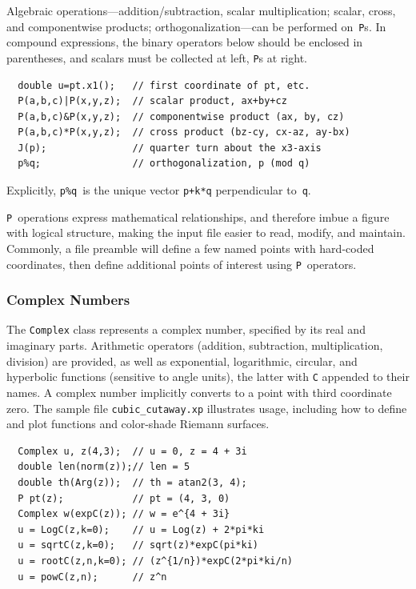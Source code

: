 \documentclass[12pt,letterpaper]{book}
\newcommand{\code}[1]{\texttt{#1}}
\newcommand{\filename}[1]{\texttt{#1}}
\newcommand{\findex}[1]{\ignorespaces}
\begin{document}
Algebraic operations---addition/subtraction, scalar multiplication;
scalar, cross, and componentwise products; orthogonalization---can
be performed on~\code{P}s.  In compound expressions, the binary
operators below should be enclosed in parentheses, and scalars must be
collected at left, \code{P}s at right.
\findex{P.x1}
\findex{P.x2}
\findex{P.x3}
\findex{J}
\begin{verbatim}
  double u=pt.x1();   // first coordinate of pt, etc.
  P(a,b,c)|P(x,y,z);  // scalar product, ax+by+cz
  P(a,b,c)&P(x,y,z);  // componentwise product (ax, by, cz)
  P(a,b,c)*P(x,y,z);  // cross product (bz-cy, cx-az, ay-bx)
  J(p);               // quarter turn about the x3-axis
  p%q;                // orthogonalization, p (mod q)
\end{verbatim}
Explicitly, \code{p\%q}~is the unique vector \code{p+k*q}
perpendicular to~\code{q}.

\code{P}~operations express mathematical relationships, and therefore
imbue a figure with logical structure, making the input file easier to
read, modify, and maintain. Commonly, a file preamble will define a
few named points with hard-coded coordinates, then define additional
points of interest using \code{P}~operators.

\subsubsection*{Complex Numbers}

The \code{Complex} class represents a complex number, specified by its
real and imaginary parts. Arithmetic operators (addition, subtraction,
multiplication, division) are provided, as well as exponential,
logarithmic, circular, and hyperbolic functions (sensitive to angle
units), the latter with \code{C} appended to their names. A complex
number implicitly converts to a point with third coordinate zero. The
sample file \filename{cubic\_cutaway.xp} illustrates usage, including
how to define and plot functions and color-shade Riemann surfaces.
\findex{Complex.re}
\findex{Complex.im}
\findex{Complex.conj}
\findex{Arg}
\findex{norm}
\findex{expC}
\findex{logC}
\findex{sqrtC}
\findex{rootC}
\findex{powC}
\findex{SinC}
\findex{CosC}
\findex{TanC}
\findex{CotC}
\findex{SecC}
\findex{CscC}
\findex{SinhC}
\findex{CoshC}
\findex{TanhC}
\findex{CothC}
\findex{SechC}
\findex{CschC}
\begin{verbatim}
  Complex u, z(4,3);  // u = 0, z = 4 + 3i
  double len(norm(z));// len = 5
  double th(Arg(z));  // th = atan2(3, 4);
  P pt(z);            // pt = (4, 3, 0)
  Complex w(expC(z)); // w = e^{4 + 3i}
  u = LogC(z,k=0);    // u = Log(z) + 2*pi*ki
  u = sqrtC(z,k=0);   // sqrt(z)*expC(pi*ki)
  u = rootC(z,n,k=0); // (z^{1/n})*expC(2*pi*ki/n)
  u = powC(z,n);      // z^n
\end{verbatim}
\end{document}
